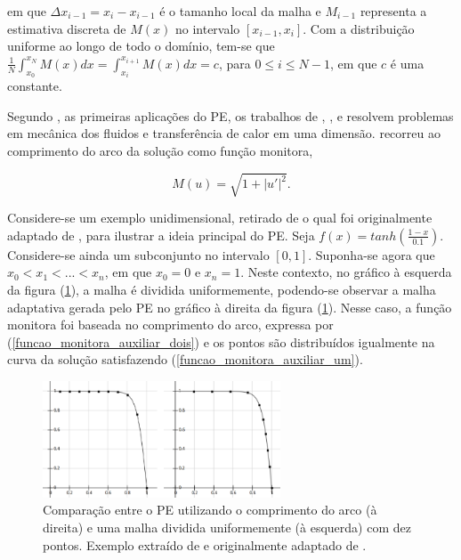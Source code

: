 \noindent em que $\Delta x_{i-1} = x_i - x_{i-1}$ é o tamanho local da malha e $M_{i-1}$ representa a estimativa discreta de $M(x)$ no intervalo $[x_{i-1}, x_i]$. Com a distribuição uniforme ao longo de todo o domínio, tem-se que $\frac{1}{N}\int_{x_0}^{x_N} M(x)dx = \int_{x_i}^{x_{i+1}} M(x)dx = c$, para $0 \leq i \leq N-1$, em que $c$ é uma constante.

Segundo , as primeiras aplicações do PE, os trabalhos de , ,  e  resolvem problemas em mecânica dos fluidos e transferência de calor em uma dimensão.  recorreu ao comprimento do arco da solução como função monitora,

\begin{equation}
 M(u) = \sqrt{1+ | u' | ^2} .
 \label{funcao_monitora_auxiliar_dois}
\end{equation}

Considere-se um exemplo unidimensional, retirado de  o qual foi originalmente adaptado de , para ilustrar a ideia principal do PE. Seja $f(x) = tanh \left( \frac{1-x}{0.1} \right)$. Considere-se ainda um subconjunto no intervalo $[0,1]$. Suponha-se agora que $x_0 < x_1 < ... < x_n$, em que $x_0 = 0$ e $x_n = 1$. Neste contexto, no gráfico à esquerda da figura (\ref{fig_principio_equidistribuicao}), a malha é dividida uniformemente, podendo-se observar a malha adaptativa gerada pelo PE no gráfico à direita da figura (\ref{fig_principio_equidistribuicao}). Nesse caso, a função monitora foi baseada no comprimento do arco, expressa por (\ref{funcao_monitora_auxiliar_dois}) e os pontos são distribuídos igualmente na curva da solução satisfazendo (\ref{funcao_monitora_auxiliar_um}). 

\begin{figure}[!ht]
  \centering
  \includegraphics[width=200pt]{imagens_malhas_moveis/principio_equidistribuicao.png}
  \caption{\footnotesize{Comparação entre o PE utilizando o comprimento do arco (à direita) e uma malha dividida uniformemente (à esquerda) com dez pontos. Exemplo extraído de  e originalmente adaptado de .
}}
  \label{fig_principio_equidistribuicao}
\end{figure}

